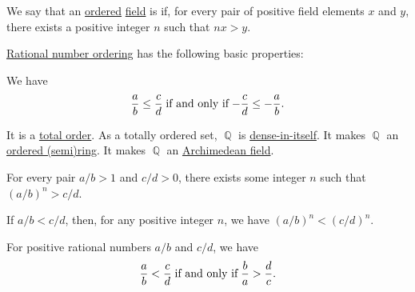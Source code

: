\begin{definition}\label{def:archimedean_field}
  We say that an \hyperref[def:ordered_semiring]{ordered} \hyperref[def:field]{field} is  if, for every pair of positive field elements \( x \) and \( y \), there exists a positive integer \( n \) such that \( nx > y \).
\end{definition}

\begin{proposition}\label{thm:def:rational_number_ordering}
  \hyperref[def:rational_number_ordering]{Rational number ordering} has the following basic properties:
  \begin{thmenum}
     We have
    \begin{equation*}
      \frac a b \leq \frac c d \T{if and only if} -\frac c d \leq -\frac a b.
    \end{equation*}

     It is a \hyperref[def:totally_ordered_set]{total order}.
     As a totally ordered set, \( \BbbQ \) is \hyperref[def:dense_total_order]{dense-in-itself}.
     It makes \( \BbbQ \) an \hyperref[def:ordered_semiring]{ordered (semi)ring}.
     It makes \( \BbbQ \) an \hyperref[def:archimedean_field]{Archimedean field}.

     For every pair \( a / b > 1 \) and \( c / d > 0 \), there exists some integer \( n \) such that \( (a / b)^n > c / d \).

     If \( a / b < c / d \), then, for any positive integer \( n \), we have \( (a / b)^n < (c / d)^n \).

     For positive rational numbers \( a / b \) and \( c / d \), we have
    \begin{equation}\label{eq:thm:def:rational_number_ordering/reciprocal}
      \frac a b < \frac c d \T{if and only if} \frac b a > \frac d c.
    \end{equation}
  \end{thmenum}
\end{proposition}
